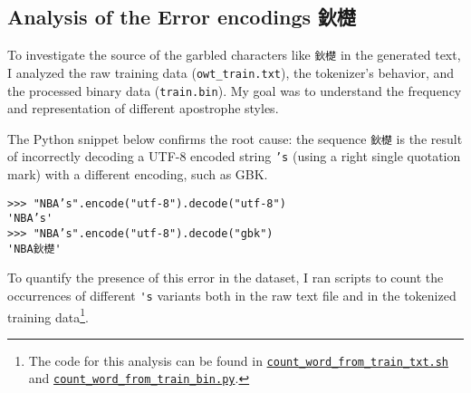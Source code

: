 \subsection{Analysis of the Error encodings 鈥檚}
\label{appendix:error-encoding}

To investigate the source of the garbled characters like \lstinline{鈥檚} in the generated text, I analyzed the raw training data (\lstinline{owt_train.txt}), the tokenizer's behavior, and the processed binary data (\lstinline{train.bin}). My goal was to understand the frequency and representation of different apostrophe styles.

The Python snippet below confirms the root cause: the sequence \lstinline{鈥檚} is the result of incorrectly decoding a UTF-8 encoded string \lstinline{’s} (using a right single quotation mark) with a different encoding, such as GBK.

\begin{lstlisting}
>>> "NBA’s".encode("utf-8").decode("utf-8")
'NBA’s'
>>> "NBA’s".encode("utf-8").decode("gbk")
'NBA鈥檚'
\end{lstlisting}

To quantify the presence of this error in the dataset, I ran scripts to count the occurrences of different \lstinline{'s} variants both in the raw text file and in the tokenized training data\footnote{The code for this analysis can be found in \href{https://github.com/donglinkang2021/cs336-assignment1-basics/blob/main/data_utils/count_word_from_train_txt.sh}{\lstinline{count_word_from_train_txt.sh}} and \href{https://github.com/donglinkang2021/cs336-assignment1-basics/blob/main/data_utils/count_word_from_train_bin.py}{\lstinline{count_word_from_train_bin.py}}.}.

